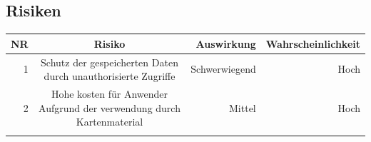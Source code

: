 \documentclass[a4paper,10pt,xetex]{article}
\begin{document}
\subsection{Risiken}\label{risiken}

\begin{longtable}[]{@{}rcrr@{}}
\toprule
\begin{minipage}[b]{0.06\columnwidth}\raggedleft\strut
\textbf{NR}\strut
\end{minipage} & \begin{minipage}[b]{0.50\columnwidth}\centering\strut
\textbf{Risiko}\strut
\end{minipage} & \begin{minipage}[b]{0.14\columnwidth}\raggedleft\strut
\textbf{Auswirkung}\strut
\end{minipage} & \begin{minipage}[b]{0.19\columnwidth}\raggedleft\strut
\textbf{Wahrscheinlichkeit}\strut
\end{minipage}\tabularnewline
\midrule
\endhead
\begin{minipage}[t]{0.06\columnwidth}\raggedleft\strut
1\strut
\end{minipage} & \begin{minipage}[t]{0.50\columnwidth}\centering\strut
Schutz der gespeicherten Daten durch unauthorisierte Zugriffe\strut
\end{minipage} & \begin{minipage}[t]{0.14\columnwidth}\raggedleft\strut
Schwerwiegend\strut
\end{minipage} & \begin{minipage}[t]{0.19\columnwidth}\raggedleft\strut
Hoch\strut
\end{minipage}\tabularnewline
\begin{minipage}[t]{0.06\columnwidth}\raggedleft\strut
2\strut
\end{minipage} & \begin{minipage}[t]{0.50\columnwidth}\centering\strut
Hohe kosten für Anwender Aufgrund der verwendung durch
Kartenmaterial\strut
\end{minipage} & \begin{minipage}[t]{0.14\columnwidth}\raggedleft\strut
Mittel\strut
\end{minipage} & \begin{minipage}[t]{0.19\columnwidth}\raggedleft\strut
Hoch\strut
\end{minipage}\tabularnewline
\begin{minipage}[t]{0.06\columnwidth}\raggedleft\strut

\end{minipage}
\end{longtable}
\end{document}
